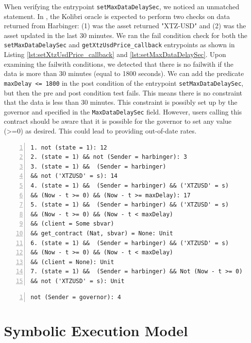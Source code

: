 \documentclass[a4paper,USenglish,cleveref, autoref, thm-restate]{lipics-v2021}
\begin{document}
When verifying the entrypoint \lstinline/setMaxDataDelaySec/, we noticed an unmatched statement. In \cite{kolibri}, the Kolibri oracle is expected to perform two checks on data returned from Harbinger: (1) was the asset returned "XTZ-USD" and (2) was the asset updated in the last 30 minutes. We ran the fail condition check for both the \lstinline/setMaxDataDelaySec/ and \lstinline/getXtzUsdPrice_callback/ entrypoints as shown in Listing \ref{lst:setXtzUsdPrice_callback} and \ref{lst:setMaxDataDelaySec}. Upon examining the failwith conditions, we detected that there is no failwith if the data is more than 30 minutes (equal to 1800 seconds). We can add the predicate \lstinline/maxDelay <= 1800/ in the post condition of the entrypoint \lstinline/setMaxDataDelaySec/, but then the pre and post condition test fails. This means there is no constraint that the data is less than 30 minutes. This constraint is possibly set up by the governor and specified in the \lstinline/MaxDataDelaySec/ field. However, users calling this contract should be aware that it is possible for the governor to set any value (>=0) as desired. This could lead to providing out-of-date rates.
\begin{lstlisting}[float=tp,captionpos=b,caption={Failwith condition for the entrypoint setXtzUsdPrice\_callback},label={lst:setXtzUsdPrice_callback},numbers=left]
1. not (state = 1): 12
2. (state = 1) && not (Sender = harbinger): 3
3. (state = 1) &&  (Sender = harbinger) 
&& not ('XTZUSD' = s): 14
4. (state = 1) &&  (Sender = harbinger) && ('XTZUSD' = s)
&& (Now - t >= 0) && (Now - t >= maxDelay): 17
5. (state = 1) &&  (Sender = harbinger) && ('XTZUSD' = s)
&& (Now - t >= 0) && (Now - t < maxDelay) 
&& (client = Some sbvar) 
&& get_contract (Nat, sbvar) = None: Unit
6. (state = 1) &&  (Sender = harbinger) && ('XTZUSD' = s)
&& (Now - t >= 0) && (Now - t < maxDelay) 
&& (client = None): Unit
7. (state = 1) &&  (Sender = harbinger) && Not (Now - t >= 0) 
&& not ('XTZUSD' = s): Unit
\end{lstlisting}

\begin{lstlisting}[float=tp,captionpos=b,caption={Failwith condition for the entrypoint setMaxDataDelaySec},label={lst:setMaxDataDelaySec},numbers=left]
not (Sender = governor): 4
\end{lstlisting}
\section{Symbolic Execution Model}
\label{sec:symbolic-execution-model}
\end{document}
